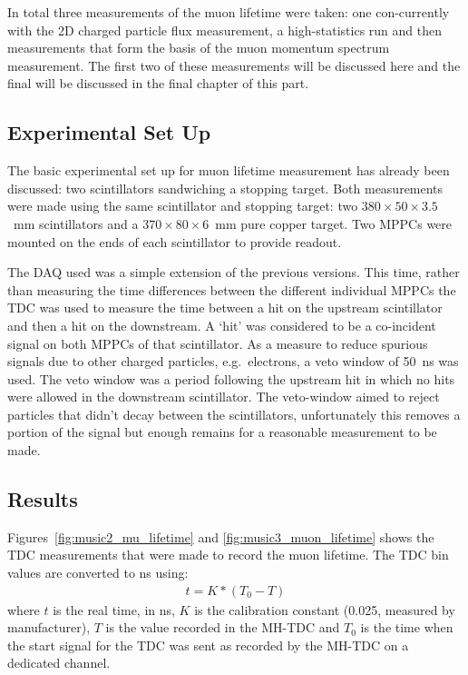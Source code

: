 In total three measurements of the muon lifetime were taken: one con-currently with the 2D charged particle flux measurement, a high-statistics run and then measurements that form the basis of the muon momentum spectrum measurement. The first two of these measurements will be discussed here and the final will be discussed in the final chapter of this part.

\subsection{Experimental Set Up} %
\label{sec:experimental_set_up}
The basic experimental set up for muon lifetime measurement has already been discussed: two scintillators sandwiching a stopping target. Both measurements were made using the same scintillator and stopping target: two \( 380\times50\times3.5 \)~mm scintillators and a \( 370\times80\times6 \)~mm pure copper target. Two MPPCs were mounted on the ends of each scintillator to provide readout. 

The DAQ used was a simple extension of the previous versions. This time, rather than measuring the time differences between the different individual MPPCs the TDC was used to measure the time between a hit on the upstream scintillator and then a hit on the downstream. A `hit' was considered to be a co-incident signal on both MPPCs of that scintillator. As a measure to reduce spurious signals due to other charged particles, e.g.\ electrons, a veto window of 50~ns was used. The veto window was a period following the upstream hit in which no hits were allowed in the downstream scintillator. The veto-window aimed to reject particles that didn't decay between the scintillators, unfortunately this removes a portion of the signal but enough remains for a reasonable measurement to be made.

\subsection{Results} %
\label{sec:results} 
Figures~\ref{fig:music2_mu_lifetime} and \ref{fig:music3_muon_lifetime} shows the TDC measurements that were made to record the muon lifetime. The TDC bin values are converted to ns using:
\begin{align}
  t = K*(T_0-T)
\end{align}
where \( t \) is the real time, in ns, \( K \) is the calibration constant (0.025, measured by manufacturer), \( T \) is the value recorded in the MH-TDC and \( T_0 \) is the time when the start signal for the TDC was sent as recorded by the MH-TDC on a dedicated channel.

